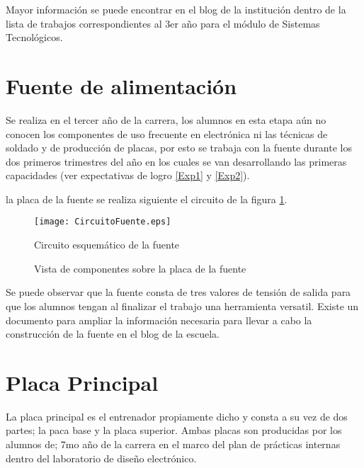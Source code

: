 Mayor información se puede encontrar en el blog de la institución dentro de la lista de trabajos correspondientes al 3er año para el módulo de Sistemas Tecnológicos. 


\section{Fuente de alimentación}
Se realiza en el tercer año de la carrera, los alumnos en esta etapa aún no conocen los componentes de uso frecuente en electrónica ni las técnicas de soldado y de producción de placas, por esto se trabaja con la fuente durante los dos primeros trimestres del año en los cuales se van desarrollando las primeras capacidades (ver expectativas de logro \ref{Exp1} y \ref{Exp2}).

la placa de la fuente se realiza siguiente el circuito de la figura \ref{CircuitoFuente}.

\begin{figure}[H]
	\texttt{[image: CircuitoFuente.eps]}\caption{Circuito esquemático de la fuente}\label{CircuitoFuente}
\end{figure}
\begin{figure}[H]
	\caption{Vista de componentes sobre la placa de la fuente}\label{LadoComponentesFuente}
\end{figure}

Se puede observar que la fuente consta de tres valores de tensión de salida para que los alumnos tengan al finalizar el trabajo una herramienta versatil. Existe un documento para ampliar la información necesaria para llevar a cabo la construcción de la fuente en el blog de la escuela.

\section{Placa Principal}
La placa principal es el entrenador propiamente dicho y consta a su vez de dos partes; la paca base y la placa superior. Ambas placas son producidas por los alumnos de; 7mo año de la carrera en el marco del plan de prácticas internas dentro del laboratorio de diseño electrónico.

	



